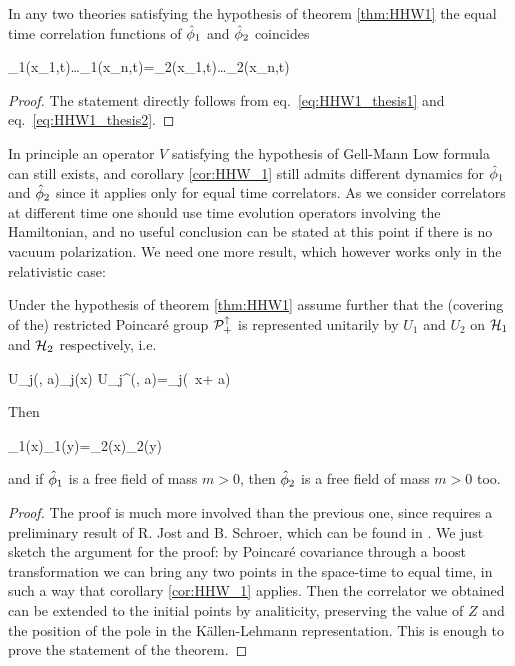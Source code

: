 \documentclass[../main/main.tex]{subfiles}
\begin{document}
\begin{corollary}\label{cor:HHW_1}
	In any two theories satisfying the hypothesis of theorem \ref{thm:HHW1} the equal time correlation functions of $\hat{\phi}_1$ and $\hat{\phi}_2$ coincides
	\begin{eq}
		\ophi_1(\vec x_1,t)\ldots\ophi_1(\vec x_n,t)=\ophi_2(\vec x_1,t)\ldots\ophi_2(\vec x_n,t)
	\end{eq}
\end{corollary} 
\begin{proof}
	The statement directly follows from eq.~\eqref{eq:HHW1_thesis1} and eq.~\eqref{eq:HHW1_thesis2}.
\end{proof}

In principle an operator $V$ satisfying the hypothesis of Gell-Mann Low formula can still exists, and corollary \ref{cor:HHW_1} still admits different dynamics for $\hat{\phi}_1$ and $\hat{\phi}_2$ since it applies only for equal time correlators. As we consider correlators at different time one should use time evolution operators involving the Hamiltonian, and no useful conclusion can be stated at this point if there is no vacuum polarization. We need one more result, which however works only in the relativistic case:

\begin{theorem}\label{thm:HHW2}
	Under the hypothesis of theorem \ref{thm:HHW1} assume further that the (covering of the) restricted Poincaré group $\mathcal P_+^\uparrow$ is represented unitarily by $U_1$ and $U_2$ on $\mathcal H_1$ and $\mathcal H_2$ respectively, i.e.
	\begin{eq}
		U_j(\Lambda, a)\ophi_j(x) U_j^\dagger(\Lambda, a)=\ophi_j(\Lambda\, x+ a)
	\end{eq}
	Then
	\begin{eq}
		\ophi_1(x)\ophi_1(y)=\ophi_2(x)\ophi_2(y)\ket{0_2}
	\end{eq}
	and if $\hat{\phi}_1$ is a free field of mass $m>0$, then $\hat{\phi}_2$ is a free field of mass $m>0$ too.
\end{theorem}
\begin{proof}
	The proof is much more involved than the previous one, since requires a preliminary result of R. Jost and B. Schroer, which can be found in \cite[Thm. 4.15]{Raymond-F.-Streater:1964}. We just sketch the argument for the proof: by Poincaré covariance through a boost transformation we can bring any two points in the space-time to equal time, in such a way that corollary \ref{cor:HHW_1} applies. Then the correlator we obtained can be extended to the initial points by analiticity, preserving the value of $Z$ and the position of the pole in the Källen-Lehmann representation. This is enough to prove the statement of the theorem.  
\end{proof}
\end{document}
